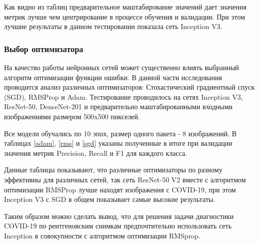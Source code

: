 

Как видно из таблиц предварительное маштабирование значений дает значения метрик лучше чем центрирование в процессе обучения и валидации. При этом лучшие результаты в данном тестировании показала сеть Inception V3.

\subsubsection{Выбор оптимизатора}
На качество работы нейронных сетей может существенно влиять выбранный алгоритм оптимизации функции ошибки. В данной части исследования проводится анализ различных оптимизаторов: Стохастический градиентный спуск (SGD), RMSProp и Adam. Тестирование проводилось на сетях Inception V3, ResNet-50, DenseNet-201 и предварительно маштабированными входными изображениями размером 500x500 пикселей.  

Все модели обучались по 10 эпох, размер одного пакета ­- 8 изображений. В таблицах \ref{adam}, \ref{rms} и \ref{sgd} указаны полученные в итоге при валидации значения метрик Precision, Recall и F1 для каждого класса.





Данные таблицы показывают, что различные оптимизаторы по разному эффективны для различных сетей, так сеть ResNet-50 V2 вместе с алгоритмом оптимизации RMSProp лучше находят изображения с COVID-19, при этом Inception V3 с SGD в общем показывает самые высокие результаты. 

Таким образом можно сделать вывод, что для решения задачи диагностики COVID-19 по рентгеновским снимкам предпочтительно использовать сеть Inception в совокупности с алгоритмом оптимизации RMSprop.



\clearpage